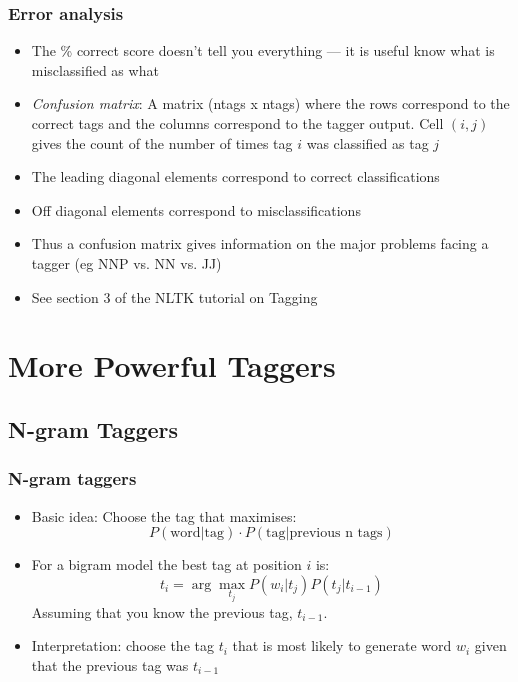 \documentclass{beamer}             %
\begin{document}
\begin{frame}
  \frametitle{Error analysis}
  \begin{itemize}
  \item The \% correct score doesn't tell you everything --- it is
    useful know what is misclassified as what
  \item \emph{Confusion matrix}: A matrix (ntags x ntags) where the rows
    correspond to the correct tags and the columns correspond to the
    tagger output.  Cell $(i,j)$ gives the count of the number of
    times tag $i$ was classified as tag $j$
  \item The leading diagonal elements correspond to correct
    classifications
  \item Off diagonal elements correspond to misclassifications 
  \item Thus a confusion matrix gives information on the major
    problems facing a tagger (eg NNP vs. NN vs. JJ)
  \item See section 3 of the NLTK tutorial on Tagging
  \end{itemize}
\end{frame}


\section{More Powerful Taggers}

\subsection{N-gram Taggers}

\begin{frame}
  \frametitle{N-gram taggers}
  \begin{itemize}
  \item Basic idea:  Choose the tag  that maximises:
    \[ P(\mbox{word} | \mbox{tag}) \cdot 
       P(\mbox{tag} | \mbox{previous n tags}) \]
       
  \item For a bigram model the best tag at position $i$ is:
    \[ t_i = \arg\max_{t_j} P(w_i|t_j) P(t_j | t_{i-1}) \]
    Assuming that you know the previous tag, $t_{i-1}$.
  \item Interpretation: choose the tag $t_i$ that is most likely to
    \alert{generate} word $w_i$ given that the previous tag was $t_{i-1}$ 
  \end{itemize}
\end{frame}
\end{document}
